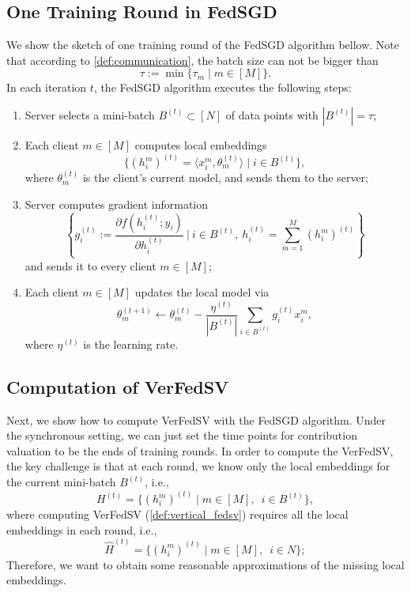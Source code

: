 \subsection{One Training Round in FedSGD}
We show the sketch of one training round of the FedSGD algorithm bellow. Note that according to \autoref{def:communication}, the batch size can not be bigger than 
\[\tau := \min\{\tau_m \mid m \in [M]\}.\] 
In each iteration $t$, the FedSGD algorithm executes the following steps:
\begin{enumerate}
    \item Server selects a mini-batch $B^{(t)} \subset [N]$ of data points with $|B^{(t)}|=\tau$;
    \item Each client $m \in [M]$ computes local embeddings 
    \[\{(h_i^m)^{(t)} = \langle x_i^m, \theta_m^{(t)} \rangle \mid i \in B^{(t)}\},\] 
    where $\theta_m^{(t)}$ is the client's current model, and sends them to the server; 
    \item Server computes gradient information
    \[\left\{ g_i^{(t)} := \frac{\partial f(h_i^{(t)}; y_i)}{\partial h_i^{(t)}} ~\bigg\vert~ i \in B^{(t)}, ~ h_i^{(t)} = \sum_{m=1}^M (h_i^m)^{(t)} \right\}\] 
    and sends it to every client $m \in [M]$;
    \item Each client $m \in [M]$ updates the local model via
    \[\theta_m^{(t+1)} \leftarrow \theta_m^{(t)} -   \frac{\eta^{(t)}}{|B^{(t)}|}\sum_{i\in B^{(t)}} g_i^{(t)} x_i^m ,\]
    where $\eta^{(t)}$ is the learning rate. 
\end{enumerate}

\subsection{Computation of VerFedSV}
Next, we show how to compute VerFedSV with the FedSGD algorithm. Under the synchronous setting, we can just set the time points for contribution valuation to be the ends of training rounds. In order to compute the VerFedSV, the key challenge is that at each round, we know only the local embeddings for the current mini-batch $B^{(t)}$, i.e.,
\[H^{(t)} = \{(h_i^m)^{(t)}\mid m \in [M], \enspace i \in B^{(t)}\},\]
where computing VerFedSV (\autoref{def:vertical_fedsv}) requires all the local embeddings in each round, i.e., 
\[\hat H^{(t)} = \{(h_i^m)^{(t)}\mid m \in [M], \enspace i \in N\};\]
Therefore, we want to obtain some reasonable approximations of the missing local embeddings. 

